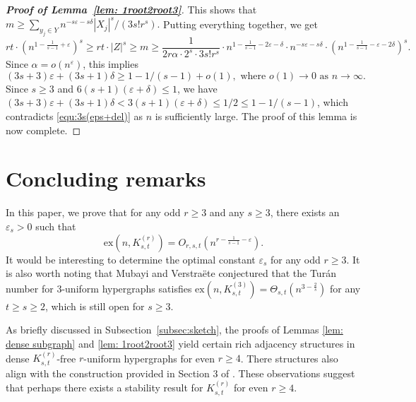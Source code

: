 \documentclass[11pt]{article}
\def\ex{\mathrm{ex}}
\begin{document}
\begin{proof}[\bf Proof of Lemma~\ref{lem: 1root2root3}]
This shows that $m\ge \sum_{y_j\in Y}n^{- s\varepsilon-s\delta }|X_j|^s/(3s!r^s).$
Putting everything together, we get
$$rt\cdot \left(n^{1-\frac{1}{s-1} +  \varepsilon }\right)^s \ge rt\cdot |Z|^s\ge m
\ge \frac{1}{2r\alpha\cdot 2^s\cdot 3s!r^s} \cdot n^{1-\frac{1}{s-1} - 2 \varepsilon -\delta}\cdot
n^{- s\varepsilon-s\delta } \cdot \left(n^{1-\frac{1}{s-1}-\varepsilon-2\delta}\right)^s.$$
Since $\alpha=o(n^\varepsilon)$,
this implies
\begin{equation}\label{equ:3s(eps+del)}
(3s+3)\varepsilon+(3s+1)\delta\ge 1-1/(s-1)+o(1), \mbox{ where } o(1)\to 0 \mbox{ as } n\to \infty.
\end{equation}
Since $s\ge 3$  and $6(s+1)(\varepsilon + \delta)\le 1$,
we have $(3s+3)\varepsilon+(3s+1)\delta < 3(s+1)(\varepsilon + \delta)\le 1/2 \le  1-1/(s-1)$,
which contradicts \eqref{equ:3s(eps+del)} as $n$ is sufficiently large.
The proof of this lemma is now complete.
\end{proof}


\section{Concluding remarks}
In this paper, we prove that for any odd $r\geq 3$ and any $s\geq 3$, there exists an $\varepsilon_s>0$ such that
$$\ex(n,K_{s,t}^{(r)})=O_{r,s,t} \left(n^{r-\frac{1}{s-1}- \varepsilon}\right).$$
It would be interesting to determine the optimal constant $\varepsilon_s$ for any odd $r\geq 3$.
It is also worth noting that Mubayi and Verstra\"ete \cite{MuVe04} conjectured that the Tur\'an number for 3-uniform hypergraphs satisfies
$\ex(n,K_{s,t}^{(3)})=\Theta_{s,t}\left(n^{3-\frac{2}{s}}\right)$ for any $t\geq s\geq 2$,
which is still open for $s\geq 3$.

As briefly discussed in Subsection~\ref{subsec:sketch},
the proofs of Lemmas \ref{lem: dense subgraph} and \ref{lem: 1root2root3} yield certain rich adjacency structures in dense $K_{s,t}^{(r)}$-free $r$-uniform hypergraphs for even $r\geq 4$.
There structures also align with the construction provided in Section 3 of \cite{BGJS23}.
These observations suggest that perhaps there exists a stability result for $K_{s,t}^{(r)}$ for even $r\geq 4$.
\end{document}
